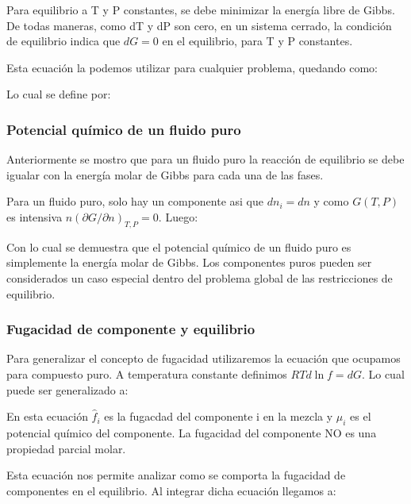 Para equilibrio a T y P constantes, se debe minimizar la energía libre de Gibbs. De todas maneras, como dT y dP son cero, en un sistema cerrado, la condición de equilibrio indica que $dG=0$ en el equilibrio, para T y P constantes.

Esta ecuación la podemos utilizar para cualquier problema, quedando como:



Lo cual se define por:

\subsubsection{Potencial químico de un fluido puro}

Anteriormente se mostro que para un fluido puro la reacción de equilibrio se debe igualar con la energía molar de Gibbs para cada una de las fases.

Para un fluido puro, solo hay un componente asi que $dn_i=dn$ y como $G(T,P)$ es intensiva $n(\partial G/\partial n)_{T,P}=0$. Luego:


Con lo cual se demuestra que el potencial químico de un fluido puro es simplemente la energía molar de Gibbs. Los componentes puros pueden ser considerados un caso especial dentro del problema global de las restricciones de equilibrio.

\subsubsection{Fugacidad de componente y equilibrio}

Para generalizar el concepto de fugacidad utilizaremos la ecuación que ocupamos para compuesto puro. A temperatura constante definimos $RT d\ln f = dG$. Lo cual puede ser generalizado a:


En esta ecuación $\hat{f}_i$ es la fugacdad del componente i en la mezcla y $\mu_i$ es el potencial químico del componente. La fugacidad del componente NO es una propiedad parcial molar.

Esta ecuación nos permite analizar como se comporta la fugacidad de componentes en el equilibrio. Al integrar dicha ecuación llegamos a:

